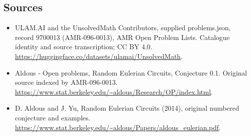 \documentclass[11pt,a4paper]{article}
\begin{document}
\subsection{Sources}
\begin{itemize}
\item[S1] ULAM.AI and the UnsolvedMath Contributors, supplied problems.json, record 9700013 (AMR-096-0013), AMR Open Problem Lists. Catalogue identity and source transcription; CC BY 4.0.
\url{https://huggingface.co/datasets/ulamai/UnsolvedMath}.
\item[S2] Aldous - Open problems, Random Eulerian Circuits, Conjecture 0.1. Original source indexed by AMR-096-0013.
\url{https://www.stat.berkeley.edu/~aldous/Research/OP/index.html}.
\item[S3] D. Aldous and J. Yu, Random Eulerian Circuits (2014), original numbered conjecture and examples.
\url{https://www.stat.berkeley.edu/~aldous/Papers/aldous_eulerian.pdf}.
\end{itemize}
\end{document}
